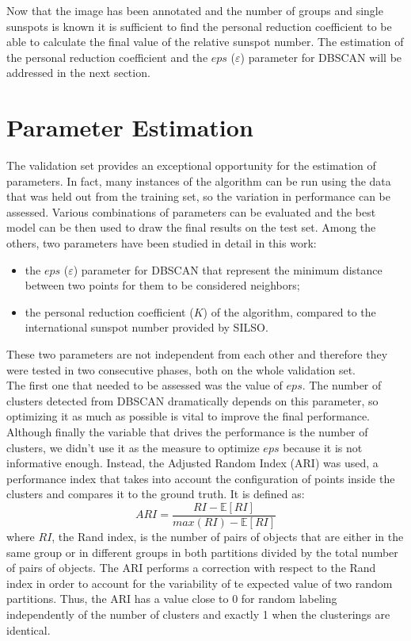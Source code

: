 Now that the image has been annotated and the number of groups and single sunspots is known it is sufficient to find the personal reduction coefficient to be able to calculate the final value of the relative sunspot number. The estimation of the personal reduction coefficient and the $eps$ ($\varepsilon$) parameter for DBSCAN will be addressed in the next section.

\section{Parameter Estimation}
The validation set provides an exceptional opportunity for the estimation of parameters. In fact, many instances of the algorithm can be run using the data that was held out from the training set, so the variation in performance can be assessed. Various combinations of parameters can be evaluated and the best model can be then used to draw the final results on the test set.
Among the others, two parameters have been studied in detail in this work:
\begin{itemize}
  \item the $eps$ ($\varepsilon$) parameter for DBSCAN that represent the minimum distance between two points for them to be considered neighbors;
  \item the personal reduction coefficient ($K$) of the algorithm, compared to the international sunspot number provided by SILSO.
\end{itemize}
These two parameters are not independent from each other and therefore they were tested in two consecutive phases, both on the whole validation set.\\
The first one that needed to be assessed was the value of $eps$. The number of clusters detected from DBSCAN dramatically depends on this parameter, so optimizing it as much as possible is vital to improve the final performance. Although finally the variable that drives the performance is the number of clusters, we didn't use it as the measure to optimize $eps$ because it is not informative enough. Instead, the Adjusted Random Index (ARI) was used, a performance index that takes into account the configuration of points inside the clusters and compares it to the ground truth. It is defined as:
\begin{equation}
ARI = \frac{RI-\mathbb{E}[RI]}{max(RI)-\mathbb{E}[RI]}
\end{equation}
where $RI$, the Rand index, is the number of pairs of objects that are either in the same group or in different groups in both partitions divided by the total number of pairs of objects. The ARI performs a correction with respect to the Rand index in order to account for the variability of te expected value of two random partitions. Thus, the ARI has a value close to 0 for random labeling independently of the number of clusters and exactly 1 when the clusterings are identical.\\
